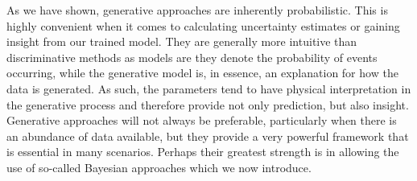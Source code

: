 As we have shown, generative approaches are inherently probabilistic.  This is highly convenient
when it comes to calculating uncertainty estimates or gaining insight from our trained model.
They are generally more intuitive than discriminative methods as models are they denote the probability
of events occurring, while the generative model is, in essence, an explanation for how the data is
generated.  As such, the parameters tend to have physical interpretation in the generative process and
therefore provide not only prediction, but also insight.  Generative approaches will not always be preferable,
particularly when there is an abundance of data available, but they provide a very powerful framework
that is essential in many scenarios.  Perhaps their greatest strength is in allowing the use of so-called
Bayesian approaches which we now introduce.
